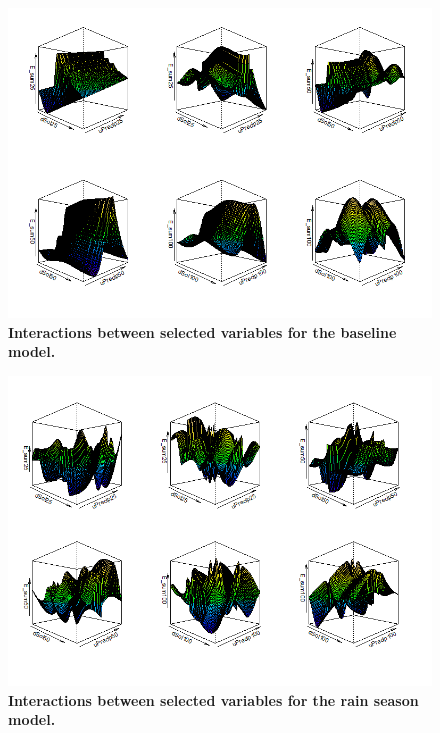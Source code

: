 \begin{landscape}
\begin{figure}[H]
  \centering
  \includegraphics[width=1.5\textwidth, inner]{visgam.png}
\caption{\textbf{Interactions between selected variables for the baseline model.}}
\label{fig:visgam}
\end{figure}



\begin{figure}[H]
  \centering
  \includegraphics[width=1.5\textwidth, inner]{visgamr.png}
\caption{\textbf{Interactions between selected variables for the rain season model.}}
\label{fig:visgamr}
\end{figure}



\end{landscape}
